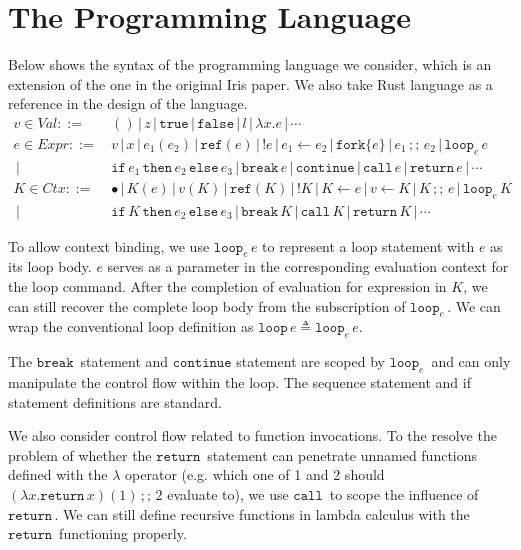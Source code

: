 \documentclass{article}
\numberwithin{algorithm}{section}
\newcommand{\true}{\texttt{true}}
\newcommand{\false}{\texttt{false}}
\newcommand{\cref}{\texttt{ref}}
\newcommand{\cfork}[1]{\texttt{fork}\{#1\}}
\newcommand{\cloop}[1]{\texttt{loop}_{#1}\,}
\newcommand{\cbreak}{\texttt{break}\,}
\newcommand{\ccontinue}{\texttt{continue}}
\newcommand{\cif}{\texttt{if}\,}
\newcommand{\cthen}{\,\texttt{then}\,}
\newcommand{\celse}{\,\texttt{else}\,}
\newcommand{\cseq}{\,;;\,}
\newcommand{\creturn}{\texttt{return}\,}
\newcommand{\ccall}{\texttt{call}\,}
\newcommand{\sep}{\,|\,}
\begin{document}
\section{The Programming Language}

Below shows the syntax of the programming language we consider, which is an extension of the one in the original Iris paper.
We also take Rust language as a reference in the design of the language.
$$
\begin{aligned}
    v \in \textit{Val} ::=\, & () \sep z \sep \true \sep \false \sep l \sep \lambda x.e \sep \cdots \\
    e \in \textit{Expr} ::=\, & v \sep x \sep e_1(e_2) \sep \cref(e) \sep !e \sep e_1 \leftarrow e_2 \sep \cfork{e} \sep e_1 \cseq e_2 \sep \cloop{e} e \\
                        \sep\, & \cif e_1 \cthen e_2 \celse e_3 \sep \cbreak e \sep \ccontinue \sep \ccall e \sep \creturn e \sep \cdots \\
    K \in \textit{Ctx} ::=\, & \bullet \sep K(e) \sep v(K) \sep \cref(K) \sep !K \sep K \leftarrow e \sep v \leftarrow K \sep K \cseq e \sep \cloop{e} K \\
                        \sep\, & \cif K \cthen e_2 \celse e_3 \sep \cbreak K \sep \ccall K \sep \creturn K \sep \cdots
\end{aligned}
$$

To allow context binding, we use $\cloop{e} e$ to represent a loop statement with $e$ as its loop body.
$e$ serves as a parameter in the corresponding evaluation context for the loop command.
After the completion of evaluation for expression in $K$, we can still recover the complete loop body from the subscription of $\cloop{e}\!$.
We can wrap the conventional loop definition as $\texttt{loop}\, e \triangleq \cloop{e} e$.

The $\cbreak\!$ statement and $\ccontinue$ statement are scoped by $\cloop{e}\!$ and can only manipulate the control flow within the loop.
The sequence statement and if statement definitions are standard.

We also consider control flow related to function invocations.
To the resolve the problem of whether the $\creturn\!$ statement can penetrate unnamed functions defined with the $\lambda$ operator (e.g. which one of 1 and 2 should $(\lambda x. \creturn x)(1) \cseq 2$ evaluate to), we use $\ccall\!$ to scope the influence of $\creturn\!$.
We can still define recursive functions in lambda calculus with the $\creturn\!$ functioning properly.
\end{document}
